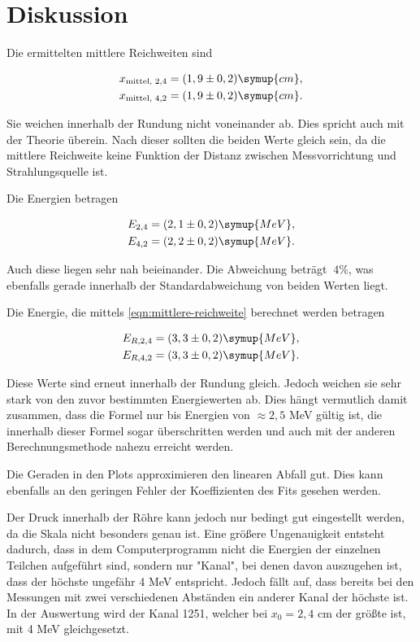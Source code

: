 \section{Diskussion}
\label{sec:Diskussion}

Die ermittelten mittlere Reichweiten sind

\begin{align}
    x_\text{mittel, 2,4} &= (1,9 \pm 0,2) \symup{cm},\\
    x_\text{mittel, 4,2} &= (1,9 \pm 0,2) \symup{cm}.
\end{align}

Sie weichen innerhalb der Rundung nicht voneinander ab. Dies spricht auch mit der Theorie überein.
Nach dieser sollten die beiden Werte gleich sein, da die mittlere Reichweite keine Funktion der Distanz zwischen Messvorrichtung und Strahlungsquelle ist.

Die Energien betragen

\begin{align}
    E_{2,4} &= (2,1 \pm 0,2) \symup{MeV},\\
    E_{4,2} &= (2,2 \pm 0,2) \symup{MeV}.
\end{align}

Auch diese liegen sehr nah beieinander. Die Abweichung beträgt $~4\%$, was ebenfalls gerade innerhalb der Standardabweichung von beiden Werten liegt.

Die Energie, die mittels \eqref{eqn:mittlere-reichweite} berechnet werden betragen

\begin{align}
    E_{R,2,4} &= (3,3 \pm 0,2) \symup{MeV},\\
    E_{R,4,2} &= (3,3 \pm 0,2) \symup{MeV}.
\end{align}

Diese Werte sind erneut innerhalb der Rundung gleich. Jedoch weichen sie sehr stark von den zuvor bestimmten Energiewerten ab.
Dies hängt vermutlich damit zusammen, dass die Formel nur bis Energien von $\approx 2,5$ MeV gültig ist, die innerhalb dieser Formel sogar überschritten werden und auch mit der anderen Berechnungsmethode nahezu erreicht werden.

Die Geraden in den Plots approximieren den linearen Abfall gut. Dies kann ebenfalls an den geringen Fehler der Koeffizienten des Fits gesehen werden.

Der Druck innerhalb der Röhre kann jedoch nur bedingt gut eingestellt werden, da die Skala nicht besonders genau ist.
Eine größere Ungenauigkeit entsteht dadurch, dass in dem Computerprogramm nicht die Energien der einzelnen Teilchen aufgeführt sind, sondern nur "Kanal",
bei denen davon auszugehen ist, dass der höchste ungefähr 4 MeV entspricht.
Jedoch fällt auf, dass bereits bei den Messungen mit zwei verschiedenen Abständen ein anderer Kanal der höchste ist.
In der Auswertung wird der Kanal 1251, welcher bei $x_0 = 2,4$ cm der größte ist, mit 4 MeV gleichgesetzt.

